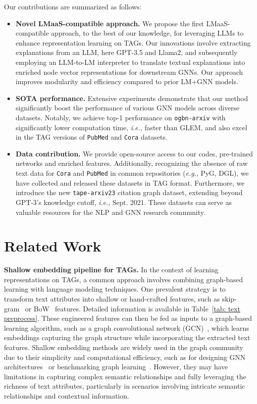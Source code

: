\documentclass{article}
\newcommand{\ie}{\emph{i.e.,}\xspace}
\newcommand{\eg}{\emph{e.g.,}\xspace}
\begin{document}
Our contributions are summarized as follows:
\begin{itemize}
    \item \textbf{Novel LMaaS-compatible approach.} We propose the first LMaaS-compatible approach, to the best of our knowledge, for leveraging LLMs to enhance representation learning on TAGs. Our innovations involve extracting explanations from an LLM, here GPT-3.5 and Llama2, and subsequently employing an LLM-to-LM interpreter to translate textual explanations into enriched node vector representations for downstream GNNs. 
Our approach improves modularity and efficiency compared to prior LM+GNN models.
    \item \textbf{SOTA performance.} Extensive experiments demonstrate that our {method} significantly boost the performance of various GNN models across diverse datasets. 
    Notably, we achieve top-1 performance on \texttt{ogbn-arxiv} with significantly lower computation time, {\ie  faster than GLEM}, and also excel in the TAG versions of \texttt{PubMed} and \texttt{Cora} datasets. 
    \item \textbf{Data contribution.} We provide open-source access to our codes, pre-trained networks and enriched features. Additionally, recognizing the absence of raw text data for \texttt{Cora} and \texttt{PubMed} in common repositories (\eg PyG, DGL), we have collected and released these datasets in TAG format. Furthermore, we introduce the new \texttt{tape-arxiv23} citation graph dataset, extending beyond GPT-3's knowledge cutoff, \ie Sept. 2021. These datasets can serve as valuable resources for the NLP and GNN research community.
\end{itemize}



\section{Related Work}

\textbf{Shallow embedding pipeline for TAGs.}
In the context of learning representations on TAGs, a common approach involves combining graph-based learning with language modeling techniques.
One prevalent strategy is to transform text attributes into shallow or hand-crafted features, such as skip-gram~\citep{mikolov2013distributed_skipgram} or BoW~\citep{harris1985distributional_bow} features. Detailed information is available in Table~\ref{tab: text preprocess}. These engineered features can then be fed as inputs to a graph-based learning algorithm, such as a graph convolutional network (GCN)~\citep{kipf2016semi_gcn}, which learns embeddings capturing the graph structure while incorporating the extracted text features. Shallow embedding methods are widely used in the graph community due to their simplicity and computational efficiency, such as for designing GNN architectures~\citep{velivckovic2017graph_gat, chiang2019cluster_gcn, velickovic2019deep_graph_informax, zhang2021graphless} or benchmarking graph learning~\citep{yang2016revisiting, hu2020open}. However, they may have limitations in capturing complex semantic relationships and fully leveraging the richness of text attributes, particularly in scenarios involving intricate semantic relationships and contextual information.
\end{document}

